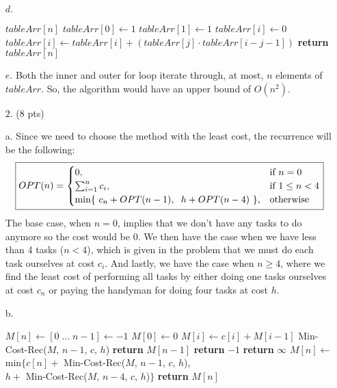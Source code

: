 \documentclass[11pt]{article}
\begin{document}
\begin{itemize}
\item[$d.$]
\begin{algorithmic}[1]
	\State $tableArr[n]$ 
	\State $tableArr[0] \gets 1$
	\State $tableArr[1] \gets 1$
		\State $tableArr[i] \gets 0$
			\State $tableArr[i] \gets tableArr[i] + (tableArr[j] \cdot tableArr[i - j -1])$
		\EndFor
	\EndFor
	\State \textbf{return} $tableArr[n]$
\EndFunction
\end{algorithmic}

\item[$e.$]
Both the inner and outer for loop iterate through, at most, $n$ elements of $tableArr$. So, the algorithm would have an upper bound of $\boxed{O(n^2)}$.

\item[$2.$] (8 pts)
	\item[a.]
	Since we need to choose the method with the least cost, the recurrence will be the following:  $$\boxed{{\displaystyle OPT(n)={
\begin{cases}{0},&{\text{if }} n = 0\\ \sum_{i=1}^{n} c_i,&{\text{if }} 1 \leq n < 4\\ \text{min\{ } c_n + OPT(n - 1), \text{\hspace{2mm}} h + OPT(n-4)\text{ \}},&{\text{otherwise}} 
\end{cases}}}}$$
	The base case, when $n = 0$, implies that we don't have any tasks to do anymore so the cost would be 0. We then have the case when we have less than 4 tasks ($n < 4$), which is given in the problem that we must do each task ourselves at cost $c_i$. And lastly, we have the case when $n \geq 4$, where we find the least cost of performing all tasks by either doing one tasks ourselves at cost $c_n$ or paying the handyman for doing four tasks at cost $h$.
	
	\item[b.]
\begin{algorithmic}[1]
		\State $M[n] \gets [ 0 \phantom{|}...\phantom{|} n - 1] \gets -1$ 
			\State $M[0] \gets 0$
				\State $M[i] \gets c[i] + M[i-1]$
			\EndFor			
		\Else
			\State Min-Cost-Rec($M$, $n-1$, $c$, $h$)
		\EndIf
		\State \textbf{return} $M[n-1]$
	\Else 	
		\State \textbf{return} $-1$
	\EndIf
\EndFunction
{} 
		\State \textbf{return} $\infty$
	\Else
		\State $M[n] \gets$ min$\{$\hspace{1mm}$c[n] +$ Min-Cost-Rec($M$, $n-1$, $c$, $h$), \\ \hspace{4.36cm} $h +$ Min-Cost-Rec($M$, $n-4$, $c$, $h$)\hspace{1mm}$\}$
		\EndIf
		\State \textbf{return} $M[n]$
	\EndIf
\EndFunction
\end{algorithmic}


\end{itemize}
\end{document}
